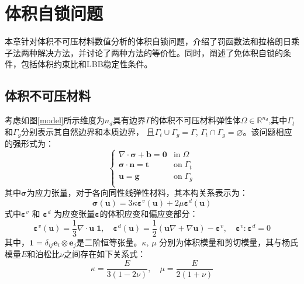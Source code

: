 \chapter{体积自锁问题}
本章针对体积不可压材料数值分析的体积自锁问题，介绍了罚函数法和拉格朗日乘子法两种解决方法，并讨论了两种方法的等价性。同时，阐述了免体积自锁的条件，包括体积约束比和LBB稳定性条件。
\section{体积不可压材料}               
考虑如图\ref{model}所示维度为$n_d$具有边界$\Gamma$的体积不可压材料弹性体$\Omega\in \mathbb R^{n_d}$,其中$\Gamma_t$和$\Gamma_g$分别表示其自然边界和本质边界，
且$\Gamma_t \cup \Gamma_g = \Gamma$, $\Gamma_t \cap \Gamma_g = \varnothing$。该问题相应的强形式为：
\begin{equation}\label{strong_penalty}
    \begin{cases}
        \nabla \cdot \boldsymbol \sigma + \boldsymbol b = \boldsymbol 0 & \mathrm{in} \; \Omega \\
        \boldsymbol \sigma \cdot \boldsymbol n = \boldsymbol t & \mathrm{on} \; \Gamma_t \\
        \boldsymbol u = \boldsymbol g & \mathrm{on} \; \Gamma_g \\
\end{cases}
\end{equation}
其中$\boldsymbol \sigma$为应力张量，对于各向同性线弹性材料，其本构关系表示为：
\begin{equation}\label{stress_penalty}
    \boldsymbol \sigma(\boldsymbol u) = 3\kappa \boldsymbol \varepsilon^v(\boldsymbol u) + 2\mu \boldsymbol \varepsilon^d(\boldsymbol u) 
\end{equation}
式中$\boldsymbol \varepsilon^v$ 和 $\boldsymbol \varepsilon^d$ 为应变张量$\boldsymbol \varepsilon$的体积应变和偏应变部分：
\begin{equation}
    \boldsymbol \varepsilon^v(\boldsymbol u) =\frac{1}{3} \nabla \cdot \boldsymbol u \; \boldsymbol 1, \quad
    \boldsymbol \varepsilon^d(\boldsymbol u) =\frac{1}{2}(\boldsymbol u \nabla + \nabla \boldsymbol u) - \boldsymbol \varepsilon^v, \quad
    \boldsymbol \varepsilon^v : \boldsymbol \varepsilon^d = 0
\end{equation}
其中，$\boldsymbol 1 = \delta_{ij} \boldsymbol e_i \otimes \boldsymbol e_j$是二阶恒等张量。$\kappa$, $\mu$ 分别为体积模量和剪切模量，其与杨氏模量$E$和泊松比$\nu$之间存在如下关系式：
\begin{equation}\label{modulus}
    \kappa = \frac{E}{3(1-2\nu)}, \quad \mu = \frac{E}{2(1+\nu)}
\end{equation}

